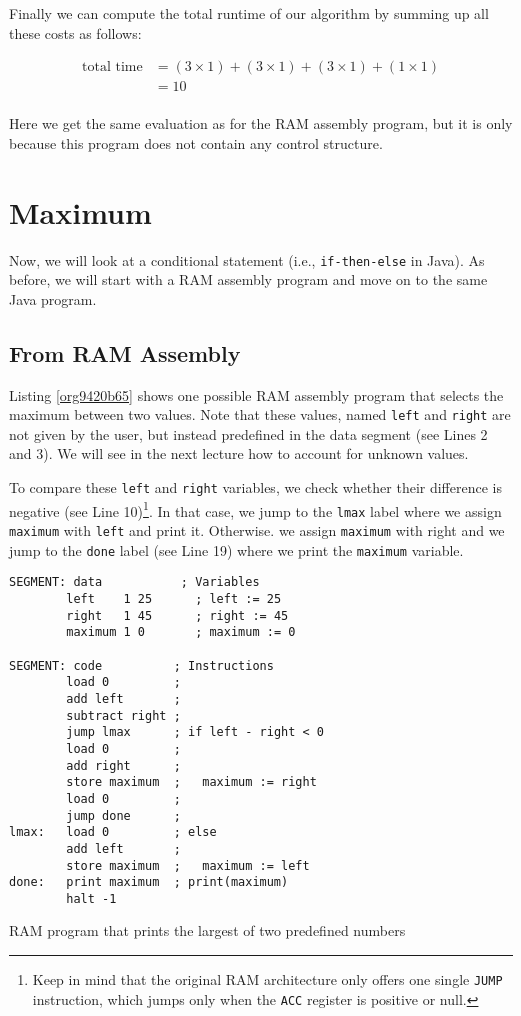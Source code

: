 \documentclass[11pt]{article}
\begin{document}
Finally we can compute the total runtime of our algorithm by summing
up all these costs as follows:

\begin{align*}
  \text{total time} &= (3 \times 1) + (3 \times 1) + (3 \times 1) + (1 \times 1) \\
                    &= 10 \\
\end{align*}

Here we get the same evaluation as for the RAM assembly program, but
it is only because this program does not contain any control structure.

\section{Maximum}
\label{sec:org4730fc3}

Now, we will look at a conditional statement (i.e., \texttt{if-then-else}
in Java). As before, we will start with a RAM assembly program and
move on to the same Java program.

\subsection{From RAM Assembly}
\label{sec:org63d4215}

Listing \ref{org9420b65} shows one possible RAM assembly program that
selects the maximum between two values. Note that these values, named
\texttt{left} and \texttt{right} are not given by the user, but instead predefined
in the data segment (see Lines 2 and 3). We will see in the
next lecture how to account for unknown values.

To compare these \texttt{left} and \texttt{right} variables, we check whether their
difference is negative (see Line 10)\footnote{Keep in mind that the original RAM architecture only offers one
single \texttt{JUMP} instruction, which jumps only when the \texttt{ACC} register is
positive or null.}. In that case, we
jump to the \texttt{lmax} label where we assign \texttt{maximum} with \texttt{left} and
print it. Otherwise. we assign \texttt{maximum} with right and we jump to the
\texttt{done} label (see Line 19) where we print the \texttt{maximum}
variable.

\begin{listing}[htbp]
\begin{verbatim}
SEGMENT: data           ; Variables
        left    1 25      ; left := 25
        right   1 45      ; right := 45
        maximum 1 0       ; maximum := 0

SEGMENT: code          ; Instructions
        load 0         ;
        add left       ;
        subtract right ;
        jump lmax      ; if left - right < 0
        load 0         ;
        add right      ;
        store maximum  ;   maximum := right 
        load 0         ;
        jump done      ;
lmax:   load 0         ; else
        add left       ;
        store maximum  ;   maximum := left
done:   print maximum  ; print(maximum)
        halt -1
\end{verbatim}
\caption{\label{org9420b65}RAM program that prints the largest of two predefined numbers}
\end{listing}
\end{document}
